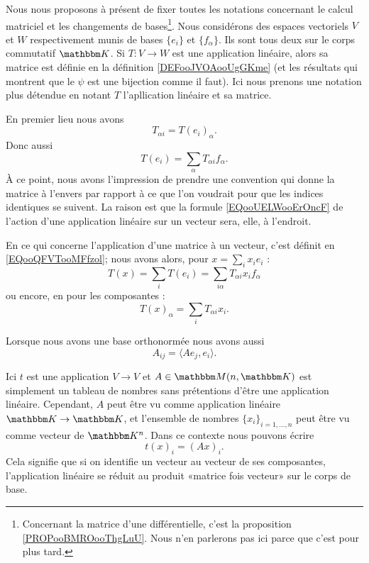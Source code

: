 Nous nous proposons à présent de fixer toutes les notations concernant le calcul matriciel et les changements de bases\footnote{Concernant la matrice d'une différentielle, c'est la proposition \ref{PROPooBMROooThgLuU}. Nous n'en parlerons pas ici parce que c'est pour plus tard.}. Nous considérons des espaces vectoriels \( V\) et \( W\) respectivement munis de bases \( \{ e_i \}\) et \( \{ f_{\alpha} \}\). Ils sont tous deux sur le corps  commutatif \( \eK\). Si \( T\colon V\to W \) est une application linéaire, alors sa matrice est définie en la définition \ref{DEFooJVOAooUgGKme} (et les résultats qui montrent que le \( \psi\) est une bijection comme il faut). Ici nous prenons une notation plus détendue en notant \( T\) l'apllication linéaire et sa matrice. 

En premier lieu nous avons
\begin{equation}        \label{EQooOMSCooGsSBIA}
    T_{\alpha i}=T(e_i)_{\alpha}.
\end{equation}
Donc aussi
\begin{equation}
    T(e_i)=\sum_{\alpha}T_{\alpha i}f_{\alpha}.
\end{equation}
À ce point, nous avons l'impression de prendre une convention qui donne la matrice à l'envers par rapport à ce que l'on voudrait pour que les indices identiques se suivent. La raison est que la formule \eqref{EQooUELWooErOncF} de l'action d'une application linéaire sur un vecteur sera, elle, à l'endroit.

En ce qui concerne l'application d'une matrice à un vecteur, c'est définit en \eqref{EQooQFVTooMFfzol}; nous avons alors, pour \( x=\sum_ix_ie_i\) :
\begin{equation}
    T(x)=\sum_iT(e_i)=\sum_{i\alpha}T_{\alpha i}x_if_{\alpha}
\end{equation}
ou encore, en pour les composantes :
\begin{equation}        \label{EQooUELWooErOncF}
    T(x)_{\alpha}=\sum_{i}T_{\alpha i}x_i.
\end{equation}

Lorsque nous avons une base orthonormée nous avons aussi
\begin{equation}        \label{EQooDSKBooQkgtWv}
    A_{ij}=\langle Ae_j, e_i\rangle .
\end{equation}

Ici \( t\) est une application \( V\to V\) et \( A\in \eM(n,\eK)\) est simplement un tableau de nombres sans prétentions d'être une application linéaire. Cependant, \( A\) peut être vu comme application linéaire \( \eK\to \eK\), et l'ensemble de nombres \( \{ x_i \}_{i=1,\ldots, n}\) peut être vu comme vecteur de \( \eK^n\). Dans ce contexte nous pouvons écrire
\begin{equation}
    t(x)_i=(Ax)_i.
\end{equation}
Cela signifie que si on identifie un vecteur au vecteur de ses composantes, l'application linéaire se réduit au produit «matrice fois vecteur» sur le corps de base.

